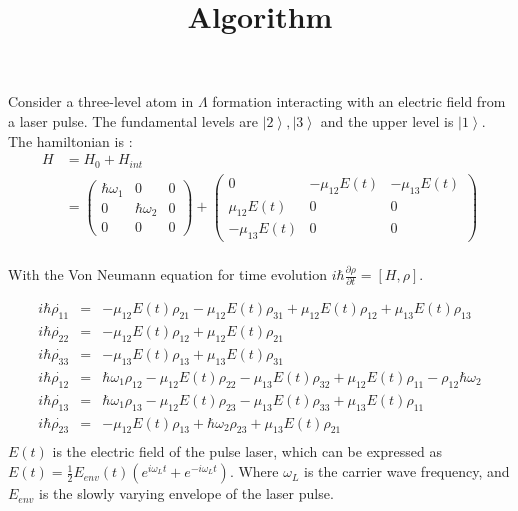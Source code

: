 \documentclass[11pt,a4paper]{article}
\title{Algorithm}
\author{}
\date{}
\begin{document}
\maketitle
Consider a three-level atom in $\Lambda$ formation interacting with an electric field from a laser pulse. The fundamental levels are $\left| 2 \right\rangle,\left| 3 \right\rangle$ and the upper level is $\left| 1 \right\rangle$. The hamiltonian is :\\
\[
\begin{align}
  H &= H_0+H_{int}\\
    &=
\left(
  \begin{array}{ccc}
    \hbar \omega_1 & 0&0\\
    0& \hbar \omega_{2}&0\\
    0&0&0
  \end{array}
\right)  +
\left(
  \begin{array}{ccc}
    0& -\mu_{12} E(t)&-\mu_{13}E(t)\\
    \mu_{12}E(t) &0&0\\
    -\mu_{13}E(t)&0&0
  \end{array}
\right)  
\end{align}
\]
\\

With the Von Neumann equation for time evolution $i \hbar \frac{\partial \rho}{\partial t} = [H,\rho]$.

\begin{eqnarray}
  \label{eq:timeevo}
  i \hbar \dot{\rho_{11}} &=& -\mu_{12}E(t)\rho_{21}-\mu_{12}E(t)\rho_{31}+\mu_{12}E(t)\rho_{12}+\mu_{13}E(t)\rho_{13}\nonumber\\
  i \hbar \dot{\rho_{22}} &=& -\mu_{12}E(t)\rho_{12}+\mu_{12}E(t)\rho_{21}\nonumber\\
  i \hbar \dot{\rho_{33}} &=& -\mu_{13}E(t)\rho_{13}+\mu_{13}E(t)\rho_{31}\nonumber\\
  i \hbar \dot{\rho_{12}} &=& \hbar\omega_{1}\rho_{12}-\mu_{12}E(t)\rho_{22}-\mu_{13}E(t)\rho_{32}+\mu_{12}E(t)\rho_{11}-\rho_{12}\hbar\omega_{2}\nonumber\\
  i \hbar \dot{\rho_{13}} &=& \hbar\omega_1\rho_{13}-\mu_{12}E(t)\rho_{23}-\mu_{13}E(t)\rho_{33}+\mu_{13}E(t)\rho_{11}\nonumber\\
  i \hbar \dot{\rho_{23}} &=& -\mu_{12}E(t)\rho_{13}+\hbar\omega_{2}\rho_{23}+\mu_{13}E(t)\rho_{21}\nonumber\\  
\end{eqnarray}
$E(t)$ is the electric field of the pulse laser, which can be expressed as $E(t) = \frac{1}{2}E_{env}(t) \left(e^{i\omega_Lt}+e^{-i\omega_Lt}  \right)$. Where $\omega_L$ is the carrier wave frequency, and $E_{env}$ is the slowly varying envelope of the laser pulse.\\
\end{document}
